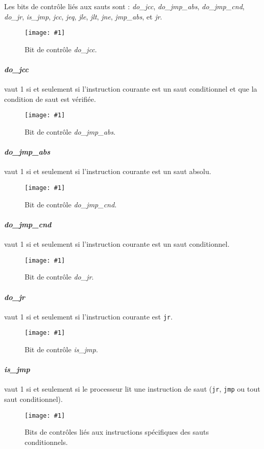 \documentclass[twoside, 12pt, a4paper]{article}
\newcommand{\cf}[3]{
    \begin{figure}[!h]
        \centering
        \texttt{[image: \#1]}
    \caption{#3}\label{Fig:#1}
    \end{figure}
}
\newcommand{\hcf}[2]{\cf{#1}{.75}{#2}}
\newcommand{\qcf}[2]{\cf{#1}{.5}{#2}}
\begin{document}
Les bits de contrôle liés aux sauts sont : \textit{do\_jcc}, \textit{do\_jmp\_abs}, \textit{do\_jmp\_cnd},
\textit{do\_jr}, \textit{is\_jmp},  \textit{jcc}, \textit{jeq}, \textit{jle}, \textit{jlt}, \textit{jne}, \textit{jmp\_abs}, et \textit{jr}.

\hcf{do_jcc.png}{Bit de contrôle \textit{do\_jcc}.}

\paragraph{\textit{do\_jcc}} vaut 1 si et seulement si l'instruction courante est un saut conditionnel et que la condition de saut est vérifiée.

\clearpage

\hcf{do_jmp_abs.png}{Bit de contrôle \textit{do\_jmp\_abs}.}

\paragraph{\textit{do\_jmp\_abs}} vaut 1 si et seulement si l'instruction courante est un saut absolu.

\hcf{do_jmp_cnd.png}{Bit de contrôle \textit{do\_jmp\_cnd}.}

\paragraph{\textit{do\_jmp\_cnd}} vaut 1 si et seulement si l'instruction courante est un saut conditionnel.

\qcf{do_jr.png}{Bit de contrôle \textit{do\_jr}.}

\paragraph{\textit{do\_jr}} vaut 1 si et seulement si l'instruction courante est \texttt{jr}.

\clearpage

\hcf{is_jmp.png}{Bit de contrôle \textit{is\_jmp}.}

\paragraph{\textit{is\_jmp}} vaut 1 si et seulement si le processeur lit une instruction de saut (\texttt{jr}, \texttt{jmp} ou tout saut conditionnel).

\hcf{jcc.png}{Bits de contrôles liés aux instructions spécifiques des sauts conditionnels.}
\end{document}
